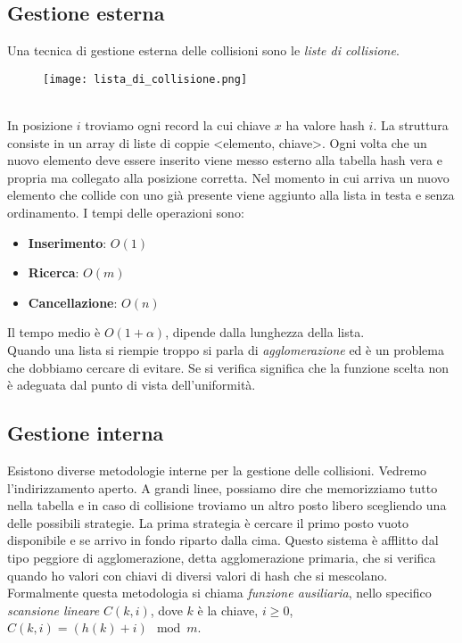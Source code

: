 \subsection{Gestione esterna}
Una tecnica di gestione esterna delle collisioni sono le \emph{liste di collisione}.\\
\begin{figure}[h]
    \texttt{[image: lista\_di\_collisione.png]}
\end{figure}
\\In posizione $i$ troviamo ogni record la cui chiave $x$ ha valore hash $i$.
La struttura consiste in un array di liste di coppie <elemento, chiave>.
Ogni volta che un nuovo elemento deve essere inserito viene messo esterno alla tabella hash vera e propria
ma collegato alla posizione corretta. Nel momento in cui arriva un nuovo elemento che collide con uno già
presente viene aggiunto alla lista in testa e senza ordinamento.
I tempi delle operazioni sono:
\begin{itemize}
    \item \textbf{Inserimento}: $O(1)$
    \item \textbf{Ricerca}: $O(m)$
    \item \textbf{Cancellazione}: $O(n)$
\end{itemize}
Il tempo medio è $O(1+\alpha)$, dipende dalla lunghezza della lista.\\
Quando una lista si riempie troppo si parla di \emph{agglomerazione} ed è un problema che dobbiamo cercare di evitare.
Se si verifica significa che la funzione scelta non è adeguata dal punto di vista dell'uniformità.

\subsection{Gestione interna}
Esistono diverse metodologie interne per la gestione delle collisioni. Vedremo l'indirizzamento aperto.
A grandi linee, possiamo dire che memorizziamo tutto nella tabella e in caso
di collisione troviamo un altro posto libero scegliendo una delle possibili strategie.
La prima strategia è cercare il primo posto vuoto disponibile e se arrivo in fondo
riparto dalla cima. Questo sistema è afflitto dal tipo peggiore di agglomerazione, detta agglomerazione
primaria, che si verifica quando ho valori con chiavi di diversi valori di hash che si mescolano.
Formalmente questa metodologia si chiama \emph{funzione ausiliaria},
nello specifico \emph{scansione lineare} $C(k,i)$, dove 
$k$ è la chiave, $i \ge 0$, $C(k,i) = (h(k)+i) \mod{m}$.

